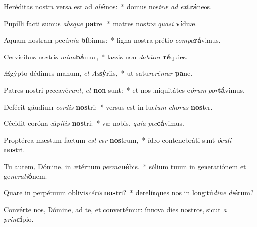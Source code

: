 \item Heréditas nostra versa est ad \textit{a}\textit{li}\textbf{é}nos:~* domus nos\textit{træ} \textit{ad} \textit{ex}\textbf{trá}neos.
\item Pupílli facti sumus \textit{abs}\textit{que} \textbf{pa}tre,~* matres nos\textit{træ} \textit{qua}\textit{si} \textbf{ví}duæ.
\item Aquam nostram pecú\textit{ni}\textit{a} \textbf{bí}bimus:~* ligna nostra préti\textit{o} \textit{com}\textit{pa}\textbf{rá}vimus.
\item Cervícibus nostris \textit{mi}\textit{na}\textbf{bá}mur,~* lassis non \textit{da}\textit{bá}\textit{tur} \textbf{ré}quies.
\item Ægýpto dédimus manum, \textit{et} \textit{As}\textbf{sý}riis,~* ut satu\textit{ra}\textit{ré}\textit{mur} \textbf{pa}ne.
\item Patres nostri peccavé\textit{runt}, \textit{et} \textbf{non} sunt:~* et nos iniquitátes e\textit{ó}\textit{rum} \textit{por}\textbf{tá}vimus.
\item Defécit gáudium \textit{cor}\textit{dis} \textbf{nos}tri:~* versus est in luc\textit{tum} \textit{cho}\textit{rus} \textbf{nos}ter.
\item Cécidit coróna cá\textit{pi}\textit{tis} \textbf{nos}tri:~* væ nobis, \textit{qui}\textit{a} \textit{pec}\textbf{cá}vimus.
\item Proptérea mæstum factum \textit{est} \textit{cor} \textbf{nos}trum,~* ídeo contenebráti sunt \textit{ó}\textit{cu}\textit{li} \textbf{nos}tri.
\item Tu autem, Dómine, in ætérnum \textit{per}\textit{ma}\textbf{né}bis,~* sólium tuum in generatiónem et ge\textit{ne}\textit{ra}\textit{ti}\textbf{ó}nem.
\item Quare in perpétuum oblivi\textit{scé}\textit{ris} \textbf{nos}tri?~* derelínques nos in longitú\textit{di}\textit{ne} \textit{di}\textbf{é}rum?
\item Convérte nos, Dómine, ad te, et convertémur: ínnova dies nostros, sicut \textit{a} \textit{prin}\textbf{cí}pio.

